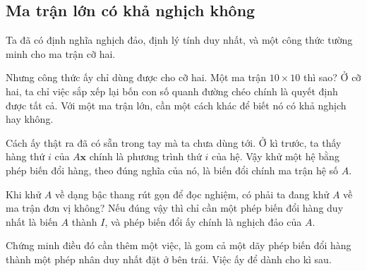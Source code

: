 \documentclass[12pt,a4paper]{article}
\begin{document}
\subsection{Ma trận lớn có khả nghịch không}

Ta đã có định nghĩa nghịch đảo, định lý tính duy nhất, và một công thức tường minh cho ma trận cỡ hai.

Nhưng công thức ấy chỉ dùng được cho cỡ hai. Một ma trận \(10\times10\) thì sao? Ở cỡ hai, ta chỉ việc sắp xếp lại bốn con số quanh đường chéo chính là quyết định được tất cả. Với một ma trận lớn, cần một cách khác để biết nó có khả nghịch hay không.

Cách ấy thật ra đã có sẵn trong tay mà ta chưa dùng tới. Ở kì trước, ta thấy hàng thứ \(i\) của \(A\mathbf{x}\) chính là phương trình thứ \(i\) của hệ. Vậy khử một hệ bằng phép biến đổi hàng, theo đúng nghĩa của nó, là biến đổi chính ma trận hệ số \(A\).

Khi khử \(A\) về dạng bậc thang rút gọn để đọc nghiệm, có phải ta đang khử \(A\) về ma trận đơn vị không? Nếu đúng vậy thì chỉ cần một phép biến đổi hàng duy nhất là biến \(A\) thành \(I\), và phép biến đổi ấy chính là nghịch đảo của \(A\).

Chứng minh điều đó cần thêm một việc, là gom cả một dãy phép biến đổi hàng thành một phép nhân duy nhất đặt ở bên trái. Việc ấy để dành cho kì sau.
\end{document}
